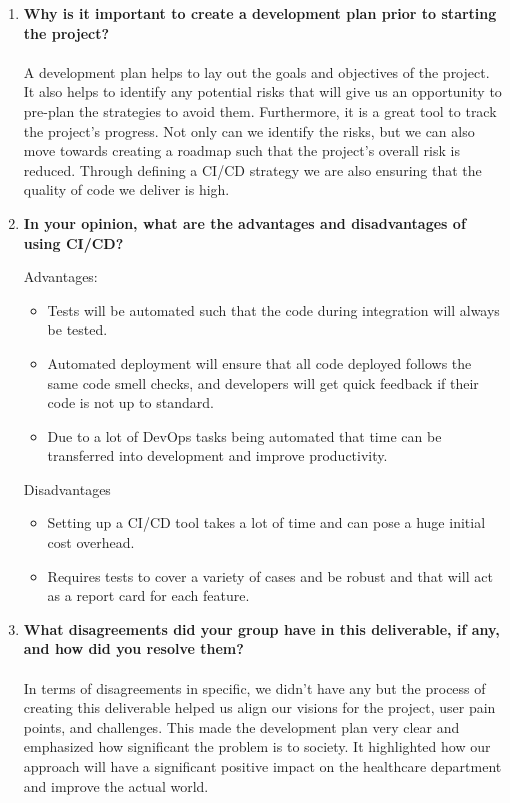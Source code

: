 \documentclass{article}
\begin{document}
\begin{enumerate}
    \item \textbf{Why is it important to create a development plan prior to starting the project?}\\\\
    A development plan helps to lay out the goals and objectives of the project. It also helps to identify any potential risks that will give us an opportunity to pre-plan the strategies to avoid them. Furthermore, it is a great tool to track the project’s progress.
    Not only can we identify the risks, but we can also move towards creating a roadmap such that the project’s overall risk is reduced. Through defining a CI/CD strategy we are also ensuring that the quality of code we deliver is high. 

    \item \textbf{In your opinion, what are the advantages and disadvantages of using CI/CD?}

    Advantages:
    \begin{itemize}
    \item Tests will be automated such that the code during integration will always be tested.   
    \item Automated deployment will ensure that all code deployed follows the same code smell checks, and developers will get quick feedback if their code is not up to standard.
    \item Due to a lot of DevOps tasks being automated that time can be transferred into development and improve productivity.
    \end{itemize}

    Disadvantages
    \begin{itemize}
    \item Setting up a CI/CD tool takes a lot of time and can pose a huge initial cost overhead.  
    \item Requires tests to cover a variety of cases and be robust and that will act as a report card for each feature.
    \end{itemize}

    \item \textbf{What disagreements did your group have in this deliverable, if any, and how did you resolve them?}\\\\
    In terms of disagreements in specific, we didn’t have any but the process of creating this deliverable helped us align our visions for the project, user pain points, and challenges. This made the development plan very clear and emphasized how significant the problem is to society. It highlighted how our approach will have a significant positive impact on the healthcare department and improve the actual world.

\end{enumerate}
\end{document}
